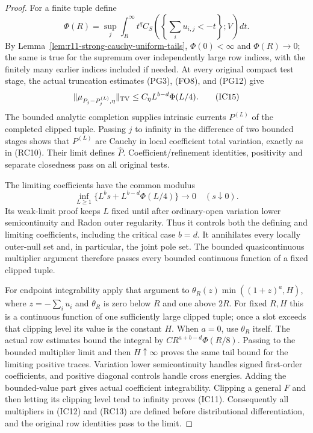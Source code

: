 \documentclass[11pt,a4paper]{article}
\numberwithin{equation}{section}
\theoremstyle{definition}
\theoremstyle{remark}
\begin{document}
\begin{proof}
For a finite tuple define
\[
 \Phi(R)=\sup_j\int_R^\infty t^q
          C_S\!\left(\left\{\sum_i u_{i,j}<-t\right\};V\right)dt.
 \tag{IC14}
\]
By Lemma~\ref{lem:r11-strong-cauchy-uniform-tails},
$\Phi(0)<\infty$ and $\Phi(R)\to0$; the same is true for
the supremum over independently large row indices, with the
finitely many earlier indices included if needed. At every
original compact test stage, the actual truncation estimates
(PG3), (FO8), and (PG12) give
\[
 \|\mu_{P_j-P_j^{(L)},\eta}\|_{\rm TV}
             \leq C_\eta L^{b-d}\Phi(L/4).
 \tag{IC15}
\]
The bounded analytic completion supplies intrinsic currents
$P^{(L)}$ of the completed clipped tuple. Passing $j$ to
infinity in the difference of two bounded stages shows that
$P^{(L)}$ are Cauchy in local coefficient total variation,
exactly as in (RC10). Their limit defines $\widehat P$.
Coefficient/refinement identities, positivity and separate
closedness pass on all original tests.

The limiting coefficients have the common modulus
\[
    \inf_{L\geq1}\{L^b s+L^{b-d}\Phi(L/4)\}
                              \longrightarrow0\quad(s\downarrow0).
 \tag{IC16}
\]
Its weak-limit proof keeps $L$ fixed until after ordinary-open
variation lower semicontinuity and Radon outer regularity.
Thus it controls both the defining and limiting coefficients,
including the critical case $b=d$. It annihilates every
locally outer-null set and, in particular, the joint pole set.
The bounded quasicontinuous multiplier argument therefore
passes every bounded continuous function of a fixed clipped
tuple.

For endpoint integrability apply that argument to
$\theta_R(z)\min((1+z)^a,H)$, where
$z=-\sum_i u_i$ and $\theta_R$ is zero below $R$ and one
above $2R$. For fixed $R,H$ this is a continuous function
of one sufficiently large clipped tuple; once a slot exceeds
that clipping level its value is the constant $H$.
When $a=0$, use $\theta_R$ itself. The actual row estimates
bound the integral by
$C R^{a+b-d}\Phi(R/8)$. Passing to the bounded multiplier
limit and then $H\uparrow\infty$ proves the same tail bound
for the limiting positive traces. Variation lower
semicontinuity handles signed first-order coefficients, and
positive diagonal controls handle cross energies.
Adding the bounded-value part gives actual coefficient
integrability. Clipping a general $F$ and then letting its
clipping level tend to infinity proves (IC11). Consequently
all multipliers in (IC12) and (RC13) are defined before
distributional differentiation, and the original row
identities pass to the limit.


\end{proof}
\end{document}
